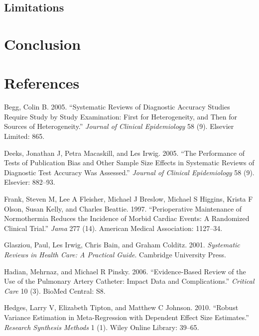 \documentclass[smallextended]{svjour3}       %
\begin{document}
\hypertarget{limitations}{%
\subsection{Limitations}\label{limitations}}

\hypertarget{conclusion}{%
\section{Conclusion}\label{conclusion}}

\hypertarget{references}{%
\section*{References}\label{references}}

\hypertarget{refs}{}
\leavevmode\hypertarget{ref-begg2005systematic}{}%
Begg, Colin B. 2005. ``Systematic Reviews of Diagnostic Accuracy Studies
Require Study by Study Examination: First for Heterogeneity, and Then
for Sources of Heterogeneity.'' \emph{Journal of Clinical Epidemiology}
58 (9). Elsevier Limited: 865.

\leavevmode\hypertarget{ref-deeks2005performance}{}%
Deeks, Jonathan J, Petra Macaskill, and Les Irwig. 2005. ``The
Performance of Tests of Publication Bias and Other Sample Size Effects
in Systematic Reviews of Diagnostic Test Accuracy Was Assessed.''
\emph{Journal of Clinical Epidemiology} 58 (9). Elsevier: 882--93.

\leavevmode\hypertarget{ref-frank1997perioperative}{}%
Frank, Steven M, Lee A Fleisher, Michael J Breslow, Michael S Higgins,
Krista F Olson, Susan Kelly, and Charles Beattie. 1997. ``Perioperative
Maintenance of Normothermia Reduces the Incidence of Morbid Cardiac
Events: A Randomized Clinical Trial.'' \emph{Jama} 277 (14). American
Medical Association: 1127--34.

\leavevmode\hypertarget{ref-glasziou2001systematic}{}%
Glasziou, Paul, Les Irwig, Chris Bain, and Graham Colditz. 2001.
\emph{Systematic Reviews in Health Care: A Practical Guide}. Cambridge
University Press.

\leavevmode\hypertarget{ref-hadian2006evidence}{}%
Hadian, Mehrnaz, and Michael R Pinsky. 2006. ``Evidence-Based Review of
the Use of the Pulmonary Artery Catheter: Impact Data and
Complications.'' \emph{Critical Care} 10 (3). BioMed Central: S8.

\leavevmode\hypertarget{ref-hedges2010robust}{}%
Hedges, Larry V, Elizabeth Tipton, and Matthew C Johnson. 2010. ``Robust
Variance Estimation in Meta-Regression with Dependent Effect Size
Estimates.'' \emph{Research Synthesis Methods} 1 (1). Wiley Online
Library: 39--65.
\end{document}
